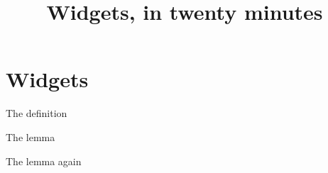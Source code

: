 \documentclass{beamer}
\title{Widgets, in twenty minutes}
\theoremstyle{definition}
\theoremstyle{plain}
\begin{document}
\begin{frame}
\titlepage
\end{frame}

\section{Widgets}\label{sy-0400}

\begin{frame}{The definition}

\end{frame}

\begin{frame}{The lemma}

\end{frame}

\begin{frame}{The lemma again}

\end{frame}
\end{document}
